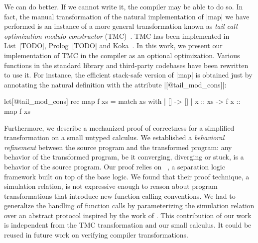 We can do better.
%
If we cannot write it, the compiler may be able to do so.
%
In fact, the manual transformation of the natural implementation of \ocaml|map| we have performed is an instance of a more general transformation known as \emph{tail call optimization modulo constructor} (TMC)~\cite{risch-73,friedman-wise-75}.
%
TMC has been implemented in List~[TODO], Prolog~[TODO] and Koka~\cite{DBLP:journals/pacmpl/LeijenL23}.
%
In this work, we present our implementation of TMC in the \OCamlLang compiler as an optional optimization.
%
Various functions in the standard library and third-party codebases have been rewritten to use it.
%
For instance, the efficient stack-safe version of \ocaml|map| is obtained just by annotating the natural definition with the attribute \ocaml|[@tail_mod_cons]|:

\begin{OCaml}
let[@tail_mod_cons] rec map f xs =
  match xs with
  | [] -> []
  | x :: xs -> f x :: map f xs
\end{OCaml}

Furthermore, we describe a mechanized proof of correctness for a simplified transformation on a small untyped calculus.
%
We established a \emph{behavioral refinement} between the source program and the transformed program: any behavior of the transformed program, be it converging, diverging or stuck, is a behavior of the source program.
%
Our proof relies on \Simuliris~\cite{DBLP:journals/pacmpl/GaherSSJDKKD22}, a separation logic framework built on top of the \Iris base logic.
%
We found that their proof technique, a simulation relation, is not expressive enough to reason about program transformations that introduce new function calling conventions.
%
We had to generalize the \Simuliris handling of function calls by parameterizing the simulation relation over an abstract protocol inspired by the work of \citet*{DBLP:journals/pacmpl/VilhenaP21}.
%
This contribution of our work is independent from the TMC transformation and our small calculus.
%
It could be reused in future work on verifying compiler transformations.

